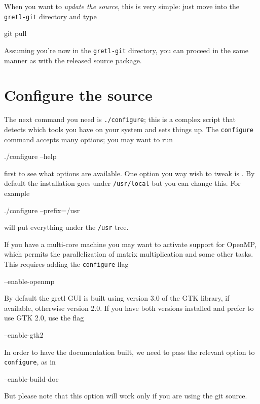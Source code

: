 When you want to \textit{update the source}, this is very simple: just
move into the \texttt{gretl-git} directory and type
\begin{code}
git pull
\end{code}

Assuming you're now in the \texttt{gretl-git} directory, you can
proceed in the same manner as with the released source package.


\section{Configure the source}
          
The next command you need is \texttt{./configure}; this is a complex
script that detects which tools you have on your system and sets
things up. The \texttt{configure} command accepts many
options; you may want to run 
\begin{code}
./configure --help
\end{code}
first to see what options are available. One option you way wish to
tweak is .  By default the installation goes under
\verb+/usr/local+ but you can change this.  For example
\begin{code}
./configure --prefix=/usr
\end{code}
will put everything under the \verb+/usr+ tree.  

If you have a multi-core machine you may want to activate support
for OpenMP, which permits the parallelization of matrix
multiplication and some other tasks. This requires adding the
\texttt{configure} flag
\begin{code}
--enable-openmp
\end{code}

By default the gretl GUI is built using version 3.0 of the GTK
library, if available, otherwise version 2.0. If you have both
versions installed and prefer to use GTK 2.0, use the flag
\begin{code}
--enable-gtk2
\end{code}

In order to have the documentation built, we need to pass the relevant
option to \texttt{configure}, as in
\begin{code}
--enable-build-doc
\end{code}
But please note that this option will work only if you are using
the git source.




